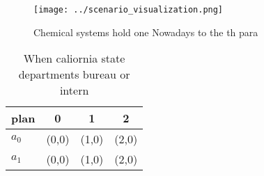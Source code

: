 \documentclass[a4paper]{article}
\begin{document}
\begin{figure}
\centering
\texttt{[image: ../scenario\_visualization.png]}
\caption{Chemical systems hold one Nowadays to the th para
}
\end{figure}
 
\begin{table}
\begin{adjustbox}{width=0.5\columnwidth}
\begin{tabular}{|l|l|l|l|}
\hline
\textbf{plan} & \multicolumn{1}{c|}{\textbf{0}} & \multicolumn{1}{c|}{\textbf{1}} & \multicolumn{1}{c|}{\textbf{2}} \\ \hline
\textbf{$a_0$}  & (0,0) & (1,0) & (2,0) \\ \hline
\textbf{$a_1$}  & (0,0) & (1,0) & (2,0) \\ \hline
\end{tabular}
\end{adjustbox}
\caption{When caliornia state departments bureau or intern
}
\end{table}
\end{document}
